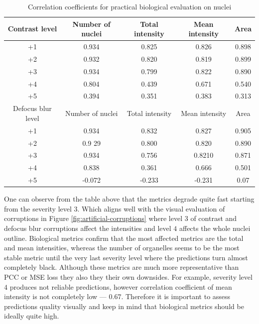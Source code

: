 \begin{table}[htb]
    \centering
    \caption{Correlation coefficients for practical biological evaluation on nuclei}
        \begin{adjustbox}{width=0.7\linewidth}
            \begin{tabular}{|c|c|c|c|c|}\hline
                Contrast level&Number of nuclei&Total intensity&Mean intensity&Area\\\hline\hline
                +1&0.934&0.825&0.826&0.898\\\hline
                +2&0.932&0.820&0.819&0.899\\\hline
                +3&0.934&0.799&0.822&0.890\\\hline
                +4&0.804&0.439&0.671&0.540\\\hline
                +5&0.394&0.351&0.383&0.313\\\hline \hline
				Defocus blur level&Number of nuclei&Total intensity&Mean intensity&Area\\\hline\hline
                +1&0.934&0.832&0.827&0.905\\\hline
                +2&0.9 29&0.800&0.820&0.890\\\hline
                +3&0.934&0.756&0.8210&0.871\\\hline
                +4&0.838&0.361&0.666&0.501\\\hline
                +5&-0.072&-0.233&-0.231&0.07\\\hline
            \end{tabular}
        \label{table:nuclei-corruptions-downstream-metrics-coefficients}
        \end{adjustbox}
\end{table} 

One can observe from the table above that the metrics degrade quite fast starting from the severity level $3$. Which aligns well with the visual evaluation of corruptions in Figure \ref{fig:artificial-corruptions} where level $3$ of contrast and defocus blur corruptions affect the intensities and level $4$ affects the whole nuclei outline. Biological metrics confirm that the most affected metrics are the total and mean intensities, whereas the number of organelles seems to be the most stable metric until the very last severity level where the predictions turn almost completely black. Although these metrics are much more representative than PCC or MSE loss they also they their own downsides. For example, severity level $4$ produces not reliable predictions, however correlation coefficient of mean intensity is not completely low --- $0.67$. Therefore it is important to assess predictions quality visually and keep in mind that biological metrics should be ideally quite high.
